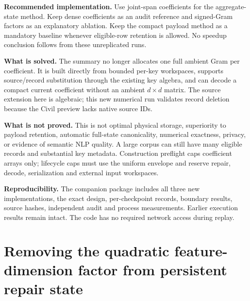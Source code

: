 \documentclass[11pt,a4paper]{article}
\begin{document}
\textbf{Recommended implementation.} Use joint-span coefficients for the
aggregate-state method. Keep dense coefficients as an audit reference and
signed-Gram factors as an explanatory ablation. Keep the compact payload
method as a mandatory baseline whenever eligible-row retention is allowed.
No speedup conclusion follows from these unreplicated runs.

\textbf{What is solved.} The summary no longer allocates one full ambient
Gram per coefficient. It is built directly from bounded per-key workspaces,
supports source/record substitution through the existing key algebra, and
can decode a compact current coefficient without an ambient $d\times d$
matrix. The source extension here is algebraic; this new numerical run
validates record deletion because the Civil preview lacks native source IDs.

\textbf{What is not proved.} This is not optimal physical storage, superiority
to payload retention, automatic full-state canonicality, numerical exactness,
privacy, or evidence of semantic NLP quality. A large corpus can still have
many eligible records and substantial key metadata. Construction preflight
caps coefficient arrays only; lifecycle caps must use the uniform envelope
and reserve repair, decode, serialization and external input workspaces.

\textbf{Reproducibility.} The companion package includes all three new
implementations, the exact design, per-checkpoint records, boundary results,
source hashes, independent audit and process measurements. Earlier execution
results remain intact. The code has no required network access during replay.
\newpage
\section{Removing the quadratic feature-dimension factor from persistent repair state}
\label{sec:memory-factor-addendum}
\end{document}
